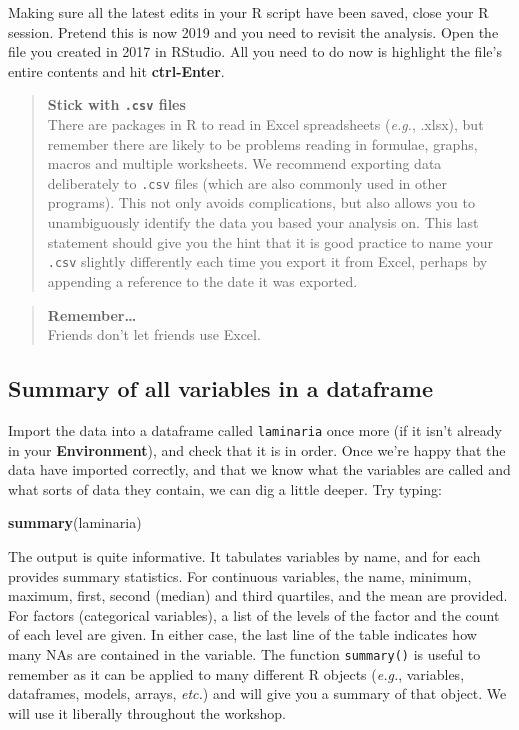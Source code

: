\documentclass[]{book}
\newenvironment{Shaded}{\begin{snugshade}}{\end{snugshade}}
\newcommand{\KeywordTok}[1]{\textcolor[rgb]{0.13,0.29,0.53}{\textbf{#1}}}
\newcommand{\NormalTok}[1]{#1}
\theoremstyle{definition}
\theoremstyle{definition}
\theoremstyle{definition}
\theoremstyle{remark}
\begin{document}
Making sure all the latest edits in your R script have been saved, close
your R session. Pretend this is now 2019 and you need to revisit the
analysis. Open the file you created in 2017 in RStudio. All you need to
do now is highlight the file's entire contents and hit
\textbf{ctrl-Enter}.

\begin{quote}
\textbf{Stick with \texttt{.csv} files}\\
There are packages in R to read in Excel spreadsheets (\emph{e.g.},
.xlsx), but remember there are likely to be problems reading in
formulae, graphs, macros and multiple worksheets. We recommend exporting
data deliberately to \texttt{.csv} files (which are also commonly used
in other programs). This not only avoids complications, but also allows
you to unambiguously identify the data you based your analysis on. This
last statement should give you the hint that it is good practice to name
your \texttt{.csv} slightly differently each time you export it from
Excel, perhaps by appending a reference to the date it was exported.
\end{quote}

\begin{quote}
\textbf{Remember\ldots{}}\\
Friends don't let friends use Excel.
\end{quote}

\subsection{Summary of all variables in a
dataframe}\label{summary-of-all-variables-in-a-dataframe}

Import the data into a dataframe called \texttt{laminaria} once more (if
it isn't already in your \textbf{Environment}), and check that it is in
order. Once we're happy that the data have imported correctly, and that
we know what the variables are called and what sorts of data they
contain, we can dig a little deeper. Try typing:

\begin{Shaded}
\begin{Highlighting}[]
\KeywordTok{summary}\NormalTok{(laminaria)}
\end{Highlighting}
\end{Shaded}

The output is quite informative. It tabulates variables by name, and for
each provides summary statistics. For continuous variables, the name,
minimum, maximum, first, second (median) and third quartiles, and the
mean are provided. For factors (categorical variables), a list of the
levels of the factor and the count of each level are given. In either
case, the last line of the table indicates how many NAs are contained in
the variable. The function \texttt{summary()} is useful to remember as
it can be applied to many different R objects (\emph{e.g.}, variables,
dataframes, models, arrays, \emph{etc.}) and will give you a summary of
that object. We will use it liberally throughout the workshop.
\end{document}
